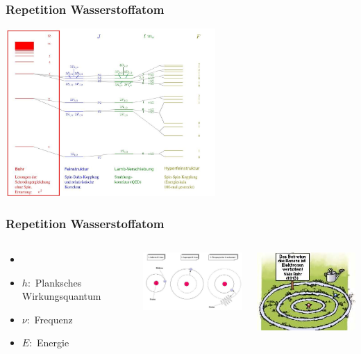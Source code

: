 
\begin{frame}
	\frametitle {Repetition Wasserstoffatom}
	\begin{center}
		\includegraphics[width = 8cm]{./pictures/energieniveaus1}
	\end{center}
\end{frame}



\begin{frame}
  \frametitle{Repetition Wasserstoffatom}
	\begin{columns}
			 \begin{itemize} 
			\item[] 
			\item[]   $h:$ Planksches  Wirkungsquantum
		 	\item[]   $\nu:$ Frequenz
		 	\item[]   $E: $ Energie
		 	\end{itemize}		 			 	
		 	\includegraphics[width = 5cm]{./pictures/wasserstoffBohr}
		 	
			\includegraphics[width = 5cm]{./pictures/verbot}
	
	\end{columns}

\end{frame}


